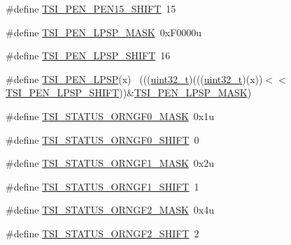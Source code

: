 \begin{DoxyCompactItemize}
\item 
\#define \hyperlink{group___t_s_i___register___masks_ga06472a71ff605b918f36b6dd770bff9c}{T\+S\+I\+\_\+\+P\+E\+N\+\_\+\+P\+E\+N15\+\_\+\+S\+H\+I\+FT}~15
\item 
\#define \hyperlink{group___t_s_i___register___masks_ga5c60f0233573e0a5436a8bf87600d347}{T\+S\+I\+\_\+\+P\+E\+N\+\_\+\+L\+P\+S\+P\+\_\+\+M\+A\+SK}~0x\+F0000u
\item 
\#define \hyperlink{group___t_s_i___register___masks_ga8a4314c8664c97a0304050452d85779b}{T\+S\+I\+\_\+\+P\+E\+N\+\_\+\+L\+P\+S\+P\+\_\+\+S\+H\+I\+FT}~16
\item 
\#define \hyperlink{group___t_s_i___register___masks_ga2c49a1ebc890fb8e3d4e7468c516d8fd}{T\+S\+I\+\_\+\+P\+E\+N\+\_\+\+L\+P\+SP}(x)                                                ~(((\hyperlink{_p_e___types_8h_a33594304e786b158f3fb30289278f5af}{uint32\+\_\+t})(((\hyperlink{_p_e___types_8h_a33594304e786b158f3fb30289278f5af}{uint32\+\_\+t})(x))$<$$<$\hyperlink{group___t_s_i___register___masks_ga8a4314c8664c97a0304050452d85779b}{T\+S\+I\+\_\+\+P\+E\+N\+\_\+\+L\+P\+S\+P\+\_\+\+S\+H\+I\+FT}))\&\hyperlink{group___t_s_i___register___masks_ga5c60f0233573e0a5436a8bf87600d347}{T\+S\+I\+\_\+\+P\+E\+N\+\_\+\+L\+P\+S\+P\+\_\+\+M\+A\+SK})
\item 
\#define \hyperlink{group___t_s_i___register___masks_gaba3b802d58cd6d4e643835d4490e0b36}{T\+S\+I\+\_\+\+S\+T\+A\+T\+U\+S\+\_\+\+O\+R\+N\+G\+F0\+\_\+\+M\+A\+SK}~0x1u
\item 
\#define \hyperlink{group___t_s_i___register___masks_gac2486b4a5a5bf2126b476abddb8854bb}{T\+S\+I\+\_\+\+S\+T\+A\+T\+U\+S\+\_\+\+O\+R\+N\+G\+F0\+\_\+\+S\+H\+I\+FT}~0
\item 
\#define \hyperlink{group___t_s_i___register___masks_ga42bc2735913907ffb279e845512720b6}{T\+S\+I\+\_\+\+S\+T\+A\+T\+U\+S\+\_\+\+O\+R\+N\+G\+F1\+\_\+\+M\+A\+SK}~0x2u
\item 
\#define \hyperlink{group___t_s_i___register___masks_ga7a2ed406413af810327157dfe369fbcb}{T\+S\+I\+\_\+\+S\+T\+A\+T\+U\+S\+\_\+\+O\+R\+N\+G\+F1\+\_\+\+S\+H\+I\+FT}~1
\item 
\#define \hyperlink{group___t_s_i___register___masks_ga05d4fda4abe0618848a2c4f6f3e80f4c}{T\+S\+I\+\_\+\+S\+T\+A\+T\+U\+S\+\_\+\+O\+R\+N\+G\+F2\+\_\+\+M\+A\+SK}~0x4u
\item 
\#define \hyperlink{group___t_s_i___register___masks_ga5521282a22145ad74736ca10c821de06}{T\+S\+I\+\_\+\+S\+T\+A\+T\+U\+S\+\_\+\+O\+R\+N\+G\+F2\+\_\+\+S\+H\+I\+FT}~2
\item 
$$
\end{DoxyCompactItemize}
